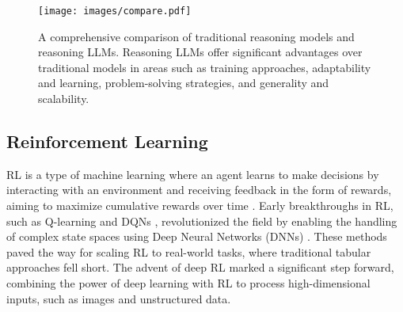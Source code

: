 






\begin{figure*}[t]
    \centering
    \texttt{[image: images/compare.pdf]}
    \caption{A comprehensive comparison of traditional reasoning models and reasoning LLMs. Reasoning LLMs offer significant advantages over traditional models in areas such as training approaches, adaptability and learning, problem-solving strategies, and generality and scalability.}
    \label{fig:compare}
\end{figure*}




\subsection{Reinforcement Learning}\label{rl}

RL is a type of machine learning where an agent learns to make decisions by interacting with an environment and receiving feedback in the form of rewards, aiming to maximize cumulative rewards over time \cite{sutton1998reinforcement}. 
Early breakthroughs in RL, such as Q-learning \cite{watkins1992q} and DQNs \cite{mnih2015human}, revolutionized the field by enabling the handling of complex state spaces using Deep Neural Networks (DNNs) \cite{torrado2018deep}. These methods paved the way for scaling RL to real-world tasks, where traditional tabular approaches fell short. 
The advent of deep RL marked a significant step forward, combining the power of deep learning with RL to process high-dimensional inputs, such as images and unstructured data.

